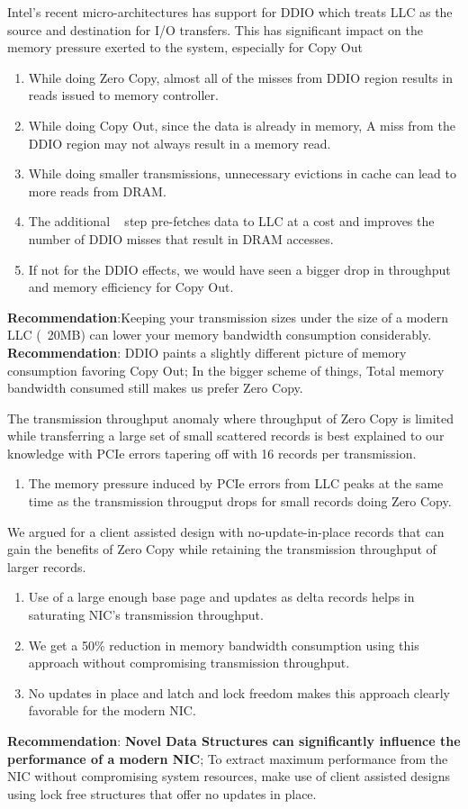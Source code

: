 Intel\textregistered's recent micro-architectures has support for DDIO which treats LLC as the source and destination for I/O transfers. This has significant impact on 
the memory pressure exerted to the system, especially for Copy Out
  \begin{enumerate}
  \item While doing Zero Copy, almost all of the misses from DDIO region results in reads issued to memory controller.
  \item While doing Copy Out, since the data is already in memory, A miss from the DDIO region may not always result in a memory read.
  \item While doing smaller transmissions, unnecessary evictions in cache can lead to more reads from DRAM. 
  \item The additional \memcpy ~ step pre-fetches data to LLC at a cost and improves the number of DDIO misses that result in DRAM accesses. 
  \item If not for the DDIO effects, we would have seen a bigger drop in throughput and memory efficiency for Copy Out. 
  \end{enumerate}
  \textbf{Recommendation}:Keeping your transmission sizes under the size of a modern LLC (~20MB) can lower your memory bandwidth consumption considerably.
  \textbf{Recommendation}: DDIO paints a slightly different picture of memory consumption favoring Copy Out; In the bigger scheme of things, Total memory bandwidth consumed still makes us prefer Zero Copy.

The transmission throughput anomaly where throughput of Zero Copy is limited while transferring a large set of small scattered records is best explained to 
our knowledge with PCIe errors tapering off with 16 records per transmission.
  \begin{enumerate}
  \item The memory pressure induced by PCIe errors from LLC peaks at the same time as the transmission througput drops for small records doing Zero Copy.
  \end{enumerate}

We argued for a client assisted design with no-update-in-place records that can gain the benefits of Zero Copy while retaining the transmission throughput of larger records.
  \begin{enumerate}
  \item Use of a large enough base page and updates as delta records helps in saturating NIC's transmission throughput.
  \item We get a 50\% reduction in memory bandwidth consumption using this approach without compromising transmission throughput.
  \item No updates in place and latch and lock freedom makes this approach clearly favorable for the modern NIC. 
  \end{enumerate}
  \textbf{Recommendation}: \textbf{Novel Data Structures can significantly influence the performance of a modern NIC}; To extract maximum performance from the NIC without compromising system resources, make use of client assisted designs using lock free structures that offer no updates in place.

